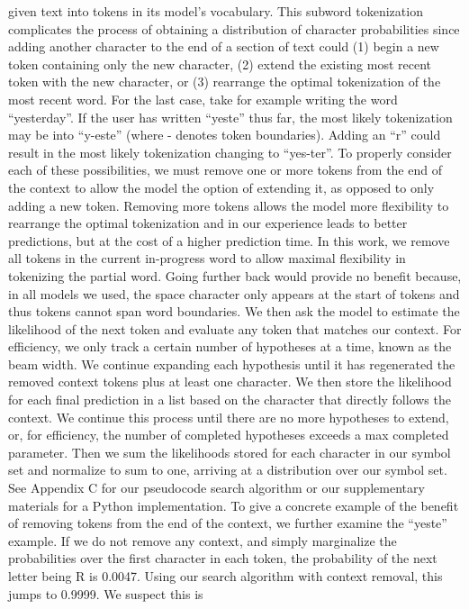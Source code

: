 given text into tokens in its model’s vocabulary.
This subword tokenization complicates the process of obtaining a distribution of character probabilities since adding another character to the end
of a section of text could (1) begin a new token
containing only the new character, (2) extend the
existing most recent token with the new character,
or (3) rearrange the optimal tokenization of the
most recent word. For the last case, take for example writing the word “yesterday”. If the user has
written “yeste” thus far, the most likely tokenization may be into “y-este” (where - denotes token
boundaries). Adding an “r” could result in the most
likely tokenization changing to “yes-ter”.
To properly consider each of these possibilities,
we must remove one or more tokens from the end
of the context to allow the model the option of extending it, as opposed to only adding a new token.
Removing more tokens allows the model more flexibility to rearrange the optimal tokenization and in
our experience leads to better predictions, but at the
cost of a higher prediction time. In this work, we
remove all tokens in the current in-progress word to
allow maximal flexibility in tokenizing the partial
word. Going further back would provide no benefit
because, in all models we used, the space character
only appears at the start of tokens and thus tokens
cannot span word boundaries.
We then ask the model to estimate the likelihood of the next token and evaluate any token that
matches our context. For efficiency, we only track
a certain number of hypotheses at a time, known
as the beam width. We continue expanding each
hypothesis until it has regenerated the removed
context tokens plus at least one character. We then
store the likelihood for each final prediction in a
list based on the character that directly follows the
context. We continue this process until there are
no more hypotheses to extend, or, for efficiency,
the number of completed hypotheses exceeds a
max completed parameter. Then we sum the likelihoods stored for each character in our symbol set
and normalize to sum to one, arriving at a distribution over our symbol set. See Appendix C for our
pseudocode search algorithm or our supplementary
materials for a Python implementation.
To give a concrete example of the benefit of
removing tokens from the end of the context, we
further examine the “yeste” example. If we do
not remove any context, and simply marginalize
the probabilities over the first character in each
token, the probability of the next letter being R is
0.0047. Using our search algorithm with context
removal, this jumps to 0.9999. We suspect this is
